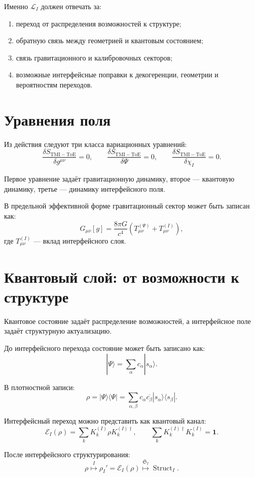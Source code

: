\documentclass[12pt,a4paper]{article}
\DeclareMathOperator{\Struct}{Struct}
\newcommand{\Lag}{\mathcal L}
\begin{document}
Именно \(\Lag_I\) должен отвечать за:
\begin{enumerate}[leftmargin=2.2em]
\item переход от распределения возможностей к структуре;
\item обратную связь между геометрией и квантовым состоянием;
\item связь гравитационного и калибровочных секторов;
\item возможные интерфейсные поправки к декогеренции, геометрии и вероятностям переходов.
\end{enumerate}

\section{Уравнения поля}

Из действия следуют три класса вариационных уравнений:
\[
\boxed{
\frac{\delta S_{\mathrm{TMI-ToE}}}{\delta g^{\mu\nu}}=0,
\qquad
\frac{\delta S_{\mathrm{TMI-ToE}}}{\delta \Psi}=0,
\qquad
\frac{\delta S_{\mathrm{TMI-ToE}}}{\delta \chi_I}=0.
}
\]

Первое уравнение задаёт гравитационную динамику, второе --- квантовую динамику, третье --- динамику интерфейсного поля.

В предельной эффективной форме гравитационный сектор может быть записан как:
\[
\boxed{
G_{\mu\nu}[g]
=
\frac{8\pi G}{c^4}
\left(
T_{\mu\nu}^{(\Psi)}
+
T_{\mu\nu}^{(I)}
\right),
}
\]
где \(T_{\mu\nu}^{(I)}\) --- вклад интерфейсного слоя.

\section{Квантовый слой: от возможности к структуре}

Квантовое состояние задаёт распределение возможностей, а интерфейсное поле задаёт структурную актуализацию.

До интерфейсного перехода состояние может быть записано как:
\[
|\Psi\rangle
=
\sum_\alpha c_\alpha |s_\alpha\rangle .
\]

В плотностной записи:
\[
\rho
=
|\Psi\rangle\langle\Psi|
=
\sum_{\alpha,\beta}
 c_\alpha\overline{c_\beta}
 |s_\alpha\rangle\langle s_\beta| .
\]

Интерфейсный переход можно представить как квантовый канал:
\[
\boxed{
\mathcal E_I(\rho)
=
\sum_k K_k^{(I)}\rho K_k^{(I)\dagger},
\qquad
\sum_k K_k^{(I)\dagger}K_k^{(I)}=\mathbf 1.
}
\]

После интерфейсного структурирования:
\[
\boxed{
\rho
\overset{I}{\longmapsto}
\rho_I'
=
\mathcal E_I(\rho)
\overset{\mathfrak S_I}{\longmapsto}
\Struct_I.
}
\]
\end{document}
